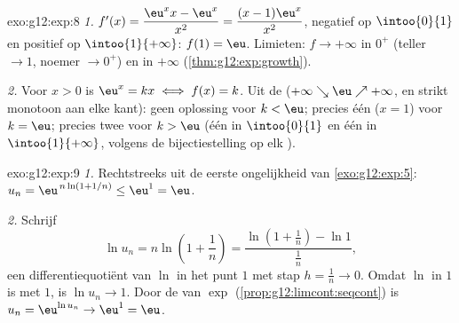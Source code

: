 \begin{solution}{exo:g12:exp:8}
\emph{1.} $f'(x) = \dfrac{\eu^x x - \eu^x}{x^2} = \dfrac{(x-1)\eu^x}{x^2}$,
negatief op $\intoo{0}{1}$ en positief op $\intoo{1}{+\infty}$: 
$f(1) = \eu$. Limieten: $f \to +\infty$ in $0^+$ (teller $\to 1$, noemer
$\to 0^+$) en in $+\infty$ (\cref{thm:g12:exp:growth}).

\emph{2.} Voor $x > 0$ is $\eu^x = kx \iff f(x) = k$. Uit de 
($+\infty \searrow \eu \nearrow +\infty$,  en strikt monotoon aan elke
kant): geen oplossing voor $k < \eu$; precies één ($x = 1$) voor $k = \eu$;
precies twee voor $k > \eu$ (één in $\intoo{0}{1}$ en één in
$\intoo{1}{+\infty}$, volgens de bijectiestelling op elk ).
\end{solution}

\begin{solution}{exo:g12:exp:9}
\emph{1.} Rechtstreeks uit de eerste ongelijkheid van
\cref{exo:g12:exp:5}: $u_n = \eu^{\,n\ln(1+1/n)} \leq \eu^1 = \eu$.

\emph{2.} Schrijf
\[
\ln u_n = n \ln\!\left(1 + \frac1n\right)
= \frac{\ln\!\left(1 + \frac1n\right) - \ln 1}{\frac1n},
\]
een differentiequotiënt van $\ln$ in het punt $1$ met stap
$h = \frac1n \to 0$. Omdat $\ln$ in $1$  is met 
$1$, is $\ln u_n \to 1$. Door de  van $\exp$
(\cref{prop:g12:limcont:seqcont}) is $u_n = \eu^{\ln u_n} \to \eu^1 = \eu$.
\end{solution}

